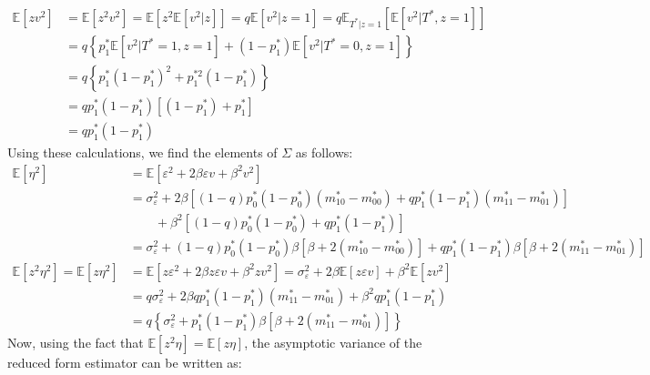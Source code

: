 \documentclass[12pt]{article}
\begin{document}
\begin{align*}
  \mathbb{E}[z v^2] &= \mathbb{E}[z^2v^2] =  \mathbb{E}\left[ z^2 \mathbb{E}\left[ v^2|z \right]  \right] = q\mathbb{E}[v^2|z=1] = q \mathbb{E}_{T^*|z=1}\left[ \mathbb{E}\left[ v^2|T^*,z=1 \right] \right]\\
  &= q\left\{ p_1^* \mathbb{E}[v^2|T^*=1,z=1] + (1 - p_1^*) \mathbb{E}\left[ v^2|T^*=0,z=1 \right] \right\}\\
  &= q\left\{ p_1^*(1-p_1^*)^2 + p_1^{*2} (1 - p_1^*) \right\}\\
  &= qp_1^*(1 - p_1^*)\left[ (1-p_1^*)+ p_1^* \right]\\
  &= qp_1^*(1 - p_1^*)
\end{align*}
Using these calculations, we find the elements of $\Sigma$ as follows:
\begin{align*}
  \mathbb{E}[\eta^2] &= \mathbb{E}[\varepsilon^2 + 2\beta \varepsilon v + \beta^2 v^2]  \\
  &= \sigma_\varepsilon^2 + 2 \beta \left[ (1-q)p_0^*(1-p_0^*)(m_{10}^* - m_{00}^*) + qp_1^*(1-p_1^*)(m_{11}^* - m_{01}^*)\right]\\
  &\qquad {} + \beta^2\left[(1-q)p_0^*(1 - p_0^*) + qp_1^*(1 - p_1^*)\right]\\
  &= \sigma_\varepsilon^2 + (1-q)p_0^*(1-p_0^*)\beta\left[ \beta + 2 \left( m_{10}^* - m_{00}^* \right) \right] + q p_1^*(1 - p_1^*)\beta\left[ \beta + 2\left( m_{11}^* - m_{01}^* \right) \right]\\
  \mathbb{E}[z^2 \eta^2] =  \mathbb{E}[z \eta^2] &= \mathbb{E}[ z \varepsilon^2 + 2\beta z \varepsilon v + \beta^2 z v^2 ] = \sigma_\varepsilon^2 + 2\beta \mathbb{E}[z \varepsilon v] + \beta^2 \mathbb{E}[zv^2]\\
  &= q\sigma_\varepsilon^2 + 2\beta q p_1^*(1-p_1^*)\left( m_{11}^* - m_{01}^* \right) + \beta^2 q p_1^*(1-p_1^*) \\
  &= q\left\{\sigma_\varepsilon^2 + p_1^*(1-p_1^*)\beta\left[ \beta + 2 \left( m_{11}^* - m_{01}^* \right) \right]\right\}
\end{align*}
Now, using the fact that $\mathbb{E}[z^2\eta] = \mathbb{E}[z\eta]$, the asymptotic variance of the reduced form estimator can be written as:
\end{document}

